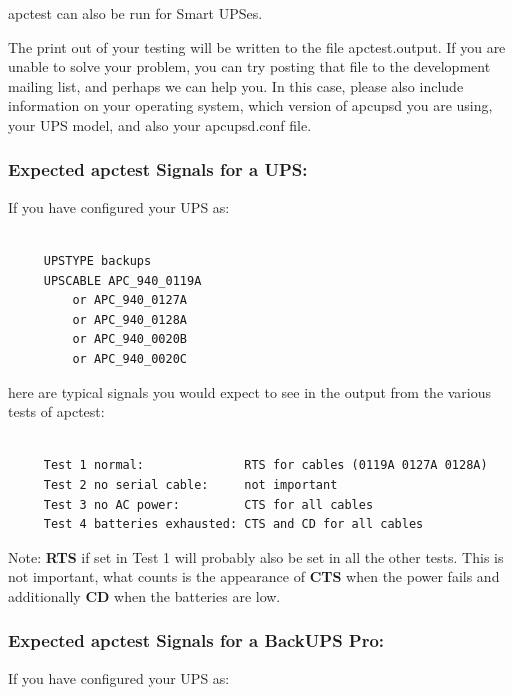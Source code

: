 {{{{{{{{{{apctest can also be run for Smart UPSes.  

The print out of your testing will be written to the file apctest.output. If
you are unable to solve your problem, you can try posting that file to the
development mailing list, and perhaps we can help you. In this case, please
also include information on your operating system, which version of apcupsd
you are using, your UPS model, and also your apcupsd.conf file. 

\label{Expected-apctest-Signals-for-a-UPS}

\subsubsection*{Expected apctest Signals for a UPS:}

\label{index-Testing-224}
\label{index-apctest-225}
If you have configured your UPS as: 

\footnotesize
\begin{verbatim}
     
     UPSTYPE backups
     UPSCABLE APC_940_0119A
         or APC_940_0127A
         or APC_940_0128A
         or APC_940_0020B
         or APC_940_0020C
\end{verbatim}
\normalsize

here are typical signals you would expect to see in the output from the
various tests of apctest: 

\footnotesize
\begin{verbatim}
     
     Test 1 normal:              RTS for cables (0119A 0127A 0128A)
     Test 2 no serial cable:     not important
     Test 3 no AC power:         CTS for all cables
     Test 4 batteries exhausted: CTS and CD for all cables
\end{verbatim}
\normalsize

Note: {\bf RTS} if set in Test 1 will probably also be set in all the other
tests. This is not important, what counts is the appearance of {\bf CTS} when
the power fails and additionally {\bf CD} when the batteries are low. 

\label{Expected-apctest-Signals-for-a-BackUPS-Pro}

\subsubsection*{Expected apctest Signals for a BackUPS Pro:}

\label{index-Testing-226}
\label{index-apctest-227}
If you have configured your UPS as: 

}}}}}}}}}}
